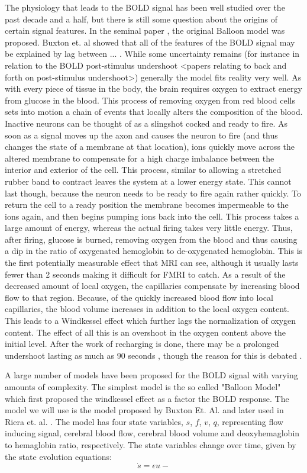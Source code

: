 \documentclass{article}
\begin{document}
The physiology that leads to the BOLD signal has been well studied over the 
past decade and a half, but there is still some question about the origins
of certain signal features. In the seminal paper \cite{Buxton1998}, the original
Balloon model was proposed. Buxton et. al showed that all of the features
of the BOLD signal may be explained by lag between ... . While some uncertainty remains (for instance in
relation to the BOLD post-stimulus undershoot <papers relating to back and
forth on post-stimulus undershoot>) generally the model fits reality very 
well. As with every piece of tissue in the body, the brain requires oxygen
to extract energy from glucose in the blood. This process of removing oxygen
from red blood cells sets into motion a chain of events that locally 
alters the composition of the blood. Inactive neurons can be thought of
as a slingshot cocked and ready to fire. As soon as a signal moves up
the axon and causes the neuron to fire (and thus changes the state
of a membrane at that location), ions quickly move across the altered
membrane to compensate for a high charge imbalance between the interior
and exterior of the cell. This process, similar to allowing a stretched
rubber band to contract leaves the system at a lower energy state. This cannot
last though, because the neuron needs to be ready to fire again rather quickly.
To return the cell to a ready position the membrane becomes impermeable
to the ions again, and then begins pumping ions back into the cell. This
process takes a large amount of energy, whereas the actual firing takes
very little energy. Thus, after firing, glucose is burned, removing oxygen
from the blood and thus causing a dip in the ratio of oxygenated hemoglobin to 
de-oxygenated hemoglobin. This is the first potentially measurable effect
that MRI can see, although it usually lasts fewer than 2 seconds making it
difficult for FMRI to catch. As a result of the decreased amount of local oxygen,
the capillaries compensate by increasing blood flow to that region. Because,
of the quickly increased blood flow into local capillaries, the blood
volume increases in addition to the local oxygen content. This leads to a Windkessel
effect which further lags the normalization of oxygen content. The effect of
all this is an overshoot in the oxygen content above the initial level. After
the work of recharging is done, there may be a prolonged undershoot lasting
as much as 90 seconds \cite{Yacoub2006}, though the reason for this
is debated \cite{Chen2009}. 

A large number of models have been proposed for the BOLD signal with varying
amounts of complexity. The simplest model is the so called "Balloon Model"
which first proposed the windkessel effect as a factor the BOLD response.
The model we will use is the model proposed by Buxton Et. Al. and later used
in Riera et. al. \cite{Riera2004}. The model has four state variables, $s$, $f$,
$v$, $q$, representing flow inducing signal, cerebral blood flow, cerebral
blood volume and deoxyhemaglobin to hemaglobin ratio, respectively. The 
state variables change over time, given by the state evolution equations:
\begin{equation}
\dot{s} = \epsilon u -  
\end{equation}
\end{document}
